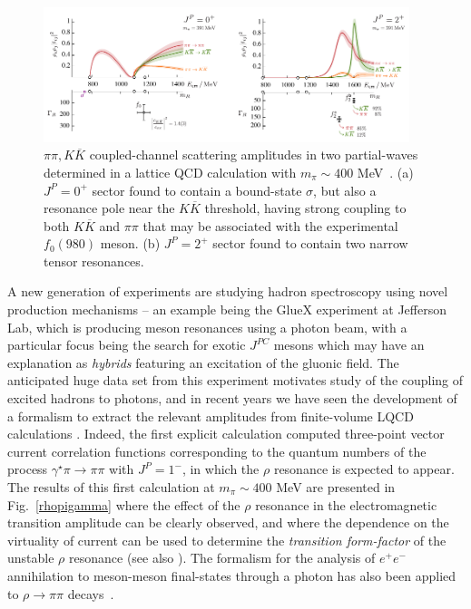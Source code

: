  
\begin{figure}
\includegraphics[width=0.95\textwidth]{figures/f0f2}
\caption{$\pi\pi, K\overline{K}$ coupled-channel scattering amplitudes in two partial-waves determined in a lattice QCD calculation with $m_\pi \sim 400$ MeV~\cite{Briceno:2017qmb}. (a) $J^P=0^+$ sector found to contain a bound-state $\sigma$, but also a resonance pole near the $K\overline{K}$ threshold, having strong coupling to both $K\overline{K}$ and $\pi\pi$ that may be associated with the experimental $f_0(980)$ meson. (b) $J^P=2^+$ sector found to contain two narrow tensor resonances.}
\label{f0f2}
\end{figure}

A new generation of experiments are studying hadron spectroscopy using novel production mechanisms -- an example being the GlueX experiment at Jefferson Lab, which is producing meson resonances using a photon beam, with a particular focus being the search for exotic $J^{PC}$  mesons which may have an explanation as \emph{hybrids} featuring an excitation of the gluonic field. The anticipated huge data set from this experiment motivates study of the coupling of excited hadrons to photons, and in recent years we have seen the development of a formalism to extract the relevant amplitudes from finite-volume LQCD calculations \cite{Briceno:2014uqa,Briceno:2015csa,Briceno:2015tza}. Indeed, the first explicit calculation \cite{Briceno:2015dca,Briceno:2016kkp} computed three-point vector current correlation functions corresponding to the quantum numbers of the process $\gamma^\star \pi \to \pi \pi$ with $J^P=1^-$, in which the $\rho$ resonance is expected to appear. The results of this first calculation at $m_\pi \sim 400$ MeV are presented in Fig.~\ref{rhopigamma} where the effect of the $\rho$ resonance in the electromagnetic transition amplitude can be clearly observed, and where the dependence on the virtuality of current can be used to determine the \emph{transition form-factor} of the unstable $\rho$ resonance (see also \cite{Alexandrou:2018jbt}). The formalism for the analysis of  $e^+ e^-$ annihilation to meson-meson final-states through a photon has also been applied to $\rho \to \pi\pi$ decays~\cite{Feng:2014gba}.

